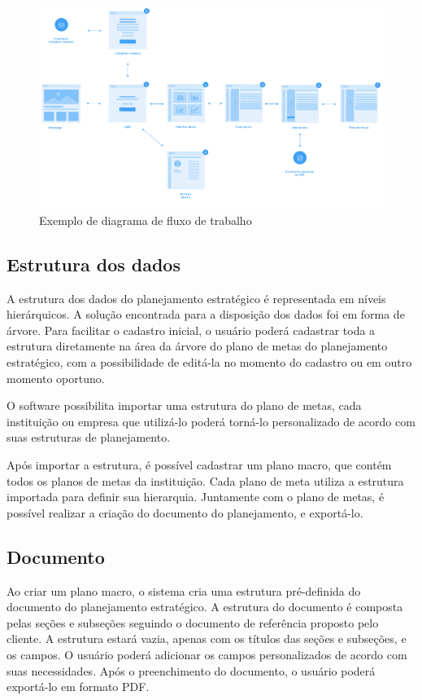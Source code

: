 \begin{figure}[H]
\centering
\includegraphics[width=1.1\textwidth]{images/flowwork.png}
\caption{Exemplo de diagrama de fluxo de trabalho}
\label{fig:workflow}
\end{figure}


\subsection{Estrutura dos dados}
A estrutura dos dados do planejamento estratégico é representada em níveis hierárquicos. A solução encontrada para a disposição dos dados foi em forma de árvore. Para facilitar o cadastro inicial, o usuário poderá cadastrar toda a estrutura diretamente na área da árvore do plano de metas do planejamento estratégico, com a possibilidade de editá-la no momento do cadastro ou em outro momento oportuno. 

O software possibilita importar uma estrutura do plano de metas, cada instituição ou empresa que utilizá-lo poderá torná-lo personalizado de acordo com suas estruturas de planejamento.

Após importar a estrutura, é possível cadastrar um plano macro, que contém todos os planos de metas da instituição. Cada plano de meta utiliza a estrutura importada para definir sua hierarquia. Juntamente com o plano de metas, é possível realizar a criação do documento do planejamento, e exportá-lo.


\subsection{Documento}
Ao criar um plano macro, o sistema cria uma estrutura pré-definida do documento do planejamento estratégico. A estrutura do documento é composta pelas seções e subseções seguindo o documento de referência proposto pelo cliente. A estrutura estará vazia, apenas com os títulos das seções e subseções, e os campos. O usuário poderá adicionar os campos personalizados de acordo com suas necessidades. Após o preenchimento do documento, o usuário poderá exportá-lo em formato PDF.












